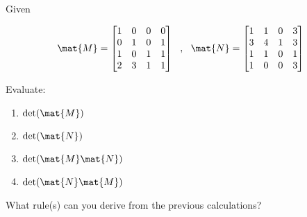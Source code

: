 \bexo
Given

\begin{equation}
	\mat{M} = \begin{bmatrix}
		1& 0& 0& 0\\
		0& 1& 0& 1\\
		1& 0& 1& 1\\
		2& 3& 1& 1
	\end{bmatrix}
	~~,~~
	\mat{N} = \begin{bmatrix}
		1& 1& 0& 3\\
		3& 4& 1& 3\\
		1& 1& 0& 1\\
		1& 0& 0& 3
	\end{bmatrix}
\end{equation}

Evaluate:

\begin{enumerate}
	\item $\mathrm{det}(\mat{M})$
	\item $\mathrm{det}(\mat{N})$
	\item $\mathrm{det}(\mat{M}\mat{N})$
	\item $\mathrm{det}(\mat{N}\mat{M})$
\end{enumerate}

What rule(s) can you derive from the previous calculations?
\eexo

